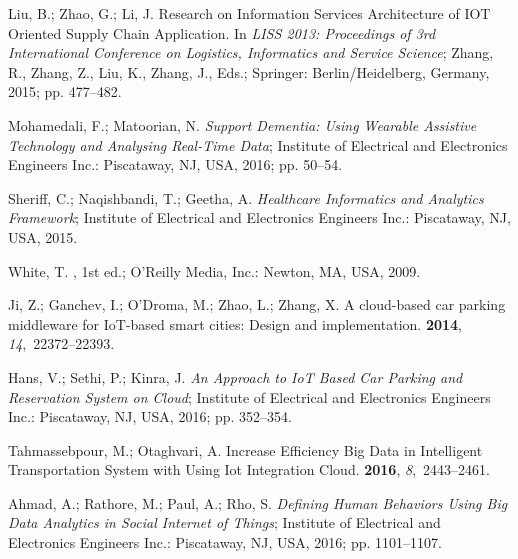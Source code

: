 \documentclass[symmetry,article,accept,moreauthors,pdftex10pt,a4paper]{mdpi}
\begin{document}
\begin{thebibliography}{999}
Liu, B.; Zhao, G.; Li, J. Research on Information Services Architecture of IOT
Oriented Supply Chain Application.
\newblock In {\em LISS 2013: Proceedings of 3rd International Conference on
	Logistics, Informatics and Service Science}; Zhang, R., Zhang, Z., Liu, K.,
Zhang, J., Eds.; Springer: Berlin/Heidelberg, Germany, 2015; pp.
477--482.

Mohamedali, F.; Matoorian, N.
\newblock \emph{Support Dementia: Using Wearable Assistive Technology and Analysing
	Real-Time Data};
\newblock Institute of Electrical and Electronics Engineers Inc.: Piscataway, NJ, USA, 2016; pp.
50--54.

Sheriff, C.; Naqishbandi, T.; Geetha, A.
\newblock \emph{Healthcare Informatics and Analytics Framework};
\newblock Institute of Electrical and Electronics Engineers Inc.: Piscataway, NJ, USA, 2015.

White, T.
, 1st ed.; O'Reilly Media, Inc.: Newton, MA, USA, 2009.

Ji, Z.; Ganchev, I.; O'Droma, M.; Zhao, L.; Zhang, X.
\newblock A cloud-based car parking middleware for IoT-based smart cities:
Design and implementation.
 {\bf 2014}, {\em 14},~22372--22393.

Hans, V.; Sethi, P.; Kinra, J.
\newblock \emph{An Approach to IoT Based Car Parking and Reservation System on Cloud};
\newblock Institute of Electrical and Electronics Engineers Inc.: Piscataway, NJ, USA, 2016; pp.
352--354.

Tahmassebpour, M.; Otaghvari, A.
\newblock Increase Efficiency Big Data in Intelligent Transportation System
with Using Iot Integration Cloud.
 {\bf 2016}, {\em
	8},~2443--2461.

Ahmad, A.; Rathore, M.; Paul, A.; Rho, S.
\newblock \emph{Defining Human Behaviors Using Big Data Analytics in Social Internet
	of Things};
\newblock Institute of Electrical and Electronics Engineers Inc.: Piscataway, NJ, USA, 2016; pp. 1101--1107.


\end{thebibliography}
\end{document}

